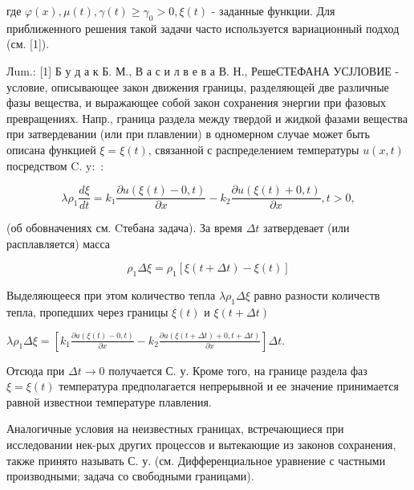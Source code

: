 \documentclass[10pt]{article}
\begin{document}
где $\varphi(x), \mu(t), \gamma(t) \geqslant \gamma_{0}>0, \xi(t)$ - заданные функции. Для приближенного решения такой задачи часто используется вариационный подход (см. [1]).



Лum.: [1] Б у д а к Б. М., В а с и л в е в а В. Н., РешеСТЕФАНА УСЈЛОВИЕ - условие, описывающее закон движения границы, разделяющей две различные фазы вещества, и выражающее собой закон сохранения энергии при фазовых превращениях. Напр., граница раздела между твердой и жидкой фазами вещества при затвердевании (или при плавлении) в одномерном случае может быть описана функцией $\xi=\xi(t)$, связанной с распределением температуры $u(x, t)$ посредством C. $\mathrm{y}:$ :



\[

\lambda \rho_{1} \frac{d \xi}{d t}=k_{1} \frac{\partial u(\xi(t)-0, t)}{\partial x}-k_{2} \frac{\partial u(\xi(t)+0, t)}{\partial x}, t>0,

\]



(об обовначениях см. Cтебана задача). За время $\Delta t$ затвердевает (или расплавляется) масса



\[

\rho_{1} \Delta \xi=\rho_{1}[\xi(t+\Delta t)-\xi(t)]

\]



Выделяющееся при этом количество тепла $\lambda \rho_{1} \Delta \xi$ равно разности количеств тепла, пропедших через границы $\xi(t)$ и $\xi(t+\Delta t)$



$\lambda \rho_{1} \Delta \xi=\left[k_{1} \frac{\partial u(\xi(t)-0, t)}{\partial x}-k_{2} \frac{\partial u(\xi(t+\Delta t)+0, t+\Delta t)}{\partial x}\right] \Delta t$.



Отсюда при $\Delta t \rightarrow 0$ получается С. у. Кроме того, на границе раздела фаз $\xi=\xi(t)$ температура предполагается непрерывной и ее значение принимается равной известнои температуре плавления.



Аналогичные условия на неизвестных границах, встречающиеся при исследовании нек-рых других процессов и вытекающие из законов сохранения, также принято называть С. у. (см. Дифференциальное уравнение с частными производными; задача со свободными границами).
\end{document}
